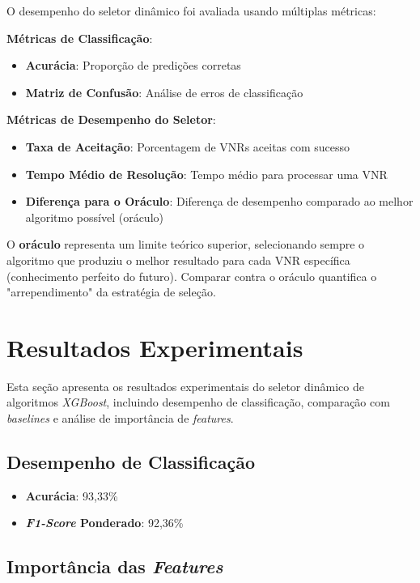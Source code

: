 \documentclass[conference]{IEEEtran}
\begin{document}
O desempenho do seletor dinâmico foi avaliada usando múltiplas métricas:

\textbf{Métricas de Classificação}:
\begin{itemize}
    \item \textbf{Acurácia}: Proporção de predições corretas
    \item \textbf{Matriz de Confusão}: Análise de erros de classificação
\end{itemize}

\textbf{Métricas de Desempenho do Seletor}:
\begin{itemize}
    \item \textbf{Taxa de Aceitação}: Porcentagem de VNRs aceitas com sucesso
    \item \textbf{Tempo Médio de Resolução}: Tempo médio para processar uma VNR
    \item \textbf{Diferença para o Oráculo}: Diferença de desempenho comparado ao melhor algoritmo possível (oráculo)
\end{itemize}

O \textbf{oráculo} representa um limite teórico superior, selecionando sempre o algoritmo que produziu o melhor resultado para cada VNR específica (conhecimento perfeito do futuro). Comparar contra o oráculo quantifica o "arrependimento" da estratégia de seleção.

\section{Resultados Experimentais}
\label{sec:Results}

Esta seção apresenta os resultados experimentais do seletor dinâmico de algoritmos \textit{XGBoost}, incluindo desempenho de classificação, comparação com \textit{baselines} e análise de importância de \textit{features}.

\subsection{Desempenho de Classificação}

\begin{itemize}
    \item \textbf{Acurácia}: 93,33\%
    \item \textbf{\textit{F1-Score} Ponderado}: 92,36\%
\end{itemize}

\subsection{Importância das \textit{Features}}
\end{document}
